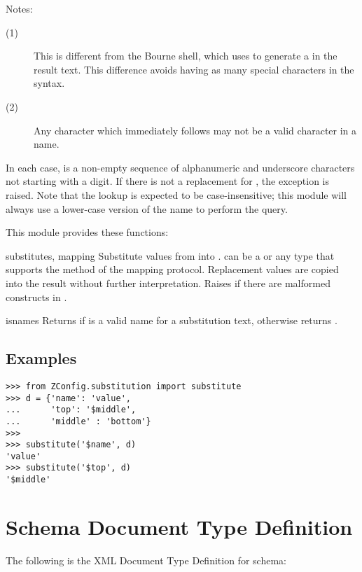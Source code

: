 \documentclass{howto}
\begin{document}
\noindent
Notes:
\begin{description}
  \item[(1)]  This is different from the Bourne shell, which uses
              \code{\textbackslash\$} to generate a \character{\$} in
              the result text.  This difference avoids having as many
              special characters in the syntax.

  \item[(2)]  Any character which immediately follows  may
              not be a valid character in a name.
\end{description}

In each case,  is a non-empty sequence of alphanumeric and
underscore characters not starting with a digit.  If there is not a
replacement for , the exception
 is raised.
Note that the lookup is expected to be case-insensitive; this module
will always use a lower-case version of the name to perform the query.

This module provides these functions:

\begin{funcdesc}{substitute}{s, mapping}
  Substitute values from  into .  
  can be a  or any type that supports the 
  method of the mapping protocol.  Replacement
  values are copied into the result without further interpretation.
  Raises  if there are malformed
  constructs in .
\end{funcdesc}

\begin{funcdesc}{isname}{s}
  Returns  if  is a valid name for a substitution
  text, otherwise returns .
\end{funcdesc}


\subsection{Examples}

\begin{verbatim}
>>> from ZConfig.substitution import substitute
>>> d = {'name': 'value',
...      'top': '$middle',
...      'middle' : 'bottom'}
>>>
>>> substitute('$name', d)
'value'
>>> substitute('$top', d)
'$middle'
\end{verbatim}


\appendix
\section{Schema Document Type Definition \label{schema-dtd}}

The following is the XML Document Type Definition for 
schema:


\end{document}
